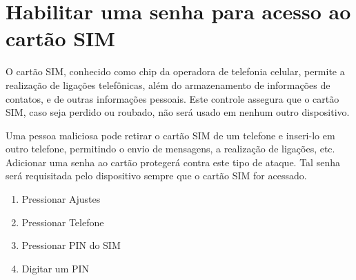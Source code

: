\section{Habilitar uma senha para acesso ao cart\~ao SIM}

O cart\~ao SIM, conhecido como chip da operadora de telefonia celular, permite a realiza\c c\~ao de liga\c c\~oes telef\^onicas, al\'em do armazenamento de informa\c c\~oes de contatos, e de outras informa\c c\~oes pessoais. Este controle assegura que o cart\~ao SIM, caso seja perdido ou roubado, n\~ao ser\'a usado em nenhum outro dispositivo.

Uma pessoa maliciosa pode retirar o cart\~ao SIM de um telefone e inseri-lo em outro telefone, permitindo o envio de mensagens, a realiza\c c\~ao de liga\c c\~oes, etc. Adicionar uma senha ao cart\~ao proteger\'a contra este tipo de ataque. Tal senha ser\'a requisitada pelo dispositivo sempre que o cart\~ao SIM for acessado.

\begin{enumerate}
\item Pressionar Ajustes
\item Pressionar Telefone
\item Pressionar PIN do SIM
\item Digitar um PIN
\end{enumerate}
